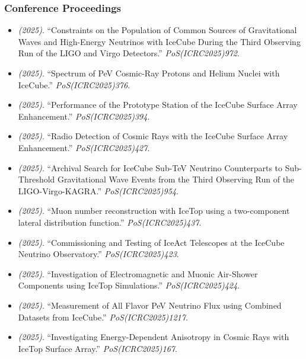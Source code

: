 \subsubsection{Conference Proceedings}
\begin{itemize}
\item \textit{(2025)}. ``Constraints on the Population of Common Sources of Gravitational Waves and High-Energy Neutrinos with IceCube During the Third Observing Run of the LIGO and Virgo Detectors.'' \textit{PoS(ICRC2025)972}.  
\item \textit{(2025)}. ``Spectrum of PeV Cosmic-Ray Protons and Helium Nuclei with IceCube.'' \textit{PoS(ICRC2025)376}.  
\item \textit{(2025)}. ``Performance of the Prototype Station of the IceCube Surface Array Enhancement.'' \textit{PoS(ICRC2025)394}.  
\item \textit{(2025)}. ``Radio Detection of Cosmic Rays with the IceCube Surface Array Enhancement.'' \textit{PoS(ICRC2025)427}.  
\item \textit{(2025)}. ``Archival Search for IceCube Sub-TeV Neutrino Counterparts to Sub-Threshold Gravitational Wave Events from the Third Observing Run of the LIGO-Virgo-KAGRA.'' \textit{PoS(ICRC2025)954}.  
\item \textit{(2025)}. ``Muon number reconstruction with IceTop using a two-component lateral distribution function.'' \textit{PoS(ICRC2025)437}.  
\item \textit{(2025)}. ``Commissioning and Testing of IceAct Telescopes at the IceCube Neutrino Observatory.'' \textit{PoS(ICRC2025)423}.  
\item \textit{(2025)}. ``Investigation of Electromagnetic and Muonic Air-Shower Components using IceTop Simulations.'' \textit{PoS(ICRC2025)424}.  
\item \textit{(2025)}. ``Measurement of All Flavor PeV Neutrino Flux using Combined Datasets from IceCube.'' \textit{PoS(ICRC2025)1217}.  
\item \textit{(2025)}. ``Investigating Energy-Dependent Anisotropy in Cosmic Rays with IceTop Surface Array.'' \textit{PoS(ICRC2025)167}.  

\end{itemize}
